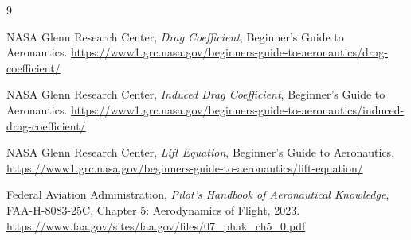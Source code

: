 \documentclass[11pt,a4paper]{article}
\begin{document}
\begin{thebibliography}{9}

NASA Glenn Research Center,
\emph{Drag Coefficient}, Beginner's Guide to Aeronautics.
\url{https://www1.grc.nasa.gov/beginners-guide-to-aeronautics/drag-coefficient/}

NASA Glenn Research Center,
\emph{Induced Drag Coefficient}, Beginner's Guide to Aeronautics.
\url{https://www1.grc.nasa.gov/beginners-guide-to-aeronautics/induced-drag-coefficient/}

NASA Glenn Research Center,
\emph{Lift Equation}, Beginner's Guide to Aeronautics.
\url{https://www1.grc.nasa.gov/beginners-guide-to-aeronautics/lift-equation/}

Federal Aviation Administration,
\emph{Pilot's Handbook of Aeronautical Knowledge}, FAA-H-8083-25C,
Chapter 5: Aerodynamics of Flight, 2023.
\url{https://www.faa.gov/sites/faa.gov/files/07_phak_ch5_0.pdf}

\end{thebibliography}
\end{document}
